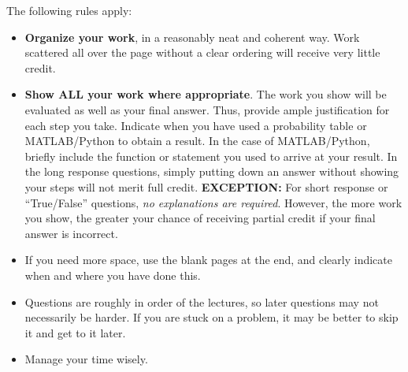\documentclass[12pt,twoside]{article}
\newcommand{\?}{\stackrel{?}{=}}
\begin{document}
\noindent The following rules apply: 
\begin{itemize}


\item \textbf{Organize your work}, in a reasonably neat and coherent way.%
 Work scattered all over the page without a clear ordering will
receive very little credit.

\item \textbf{Show ALL your work where appropriate}.
  The work you show will be evaluated as well as your final answer.
  Thus, provide ample justification for each step you take.
  Indicate when you have used a probability table or MATLAB/Python to obtain a result.
  In the case of MATLAB/Python, briefly include the function or statement you used to arrive at your result.
  In the long response questions, simply putting down an answer without showing your steps  will not merit full credit.
  {\bf EXCEPTION:} For short response or ``True/False'' questions, \textit{no explanations are required}.
  However, the more work you show, the greater your chance of receiving partial credit if your final answer is incorrect.

\item If you need more space, use the blank pages at the end, and clearly indicate when and where you have done this.

\item Questions are roughly in order of the lectures, so later questions may not necessarily be harder.
  If you are stuck on a problem, it may be better to skip it and get to it later.

\item Manage your time wisely.%

\end{itemize}
\end{document}
